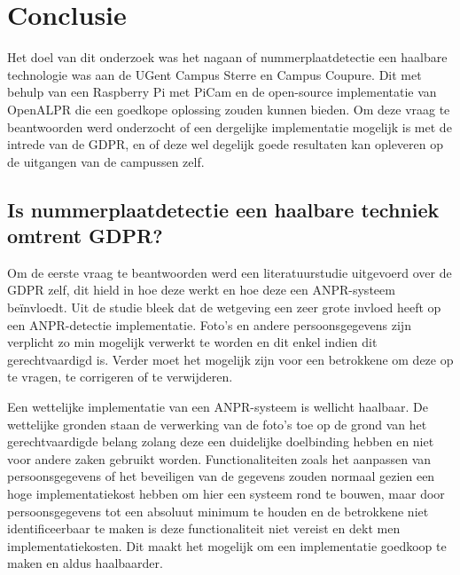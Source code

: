
\chapter{Conclusie}
\label{ch:conclusie}


Het doel van dit onderzoek was het nagaan of nummerplaatdetectie een haalbare technologie was aan de UGent Campus Sterre en Campus Coupure. Dit met behulp van een Raspberry Pi met PiCam en de open-source implementatie van OpenALPR die een goedkope oplossing zouden kunnen bieden. Om deze vraag te beantwoorden werd onderzocht of een dergelijke implementatie mogelijk is met de intrede van de GDPR, en of deze wel degelijk goede resultaten kan opleveren op de uitgangen van de campussen zelf.

\section{Is nummerplaatdetectie een haalbare techniek omtrent GDPR?}
Om de eerste vraag te beantwoorden werd een literatuurstudie uitgevoerd over de GDPR zelf, dit hield in hoe deze werkt en hoe deze een ANPR-systeem beïnvloedt. Uit de studie bleek dat de wetgeving een zeer grote invloed heeft op een ANPR-detectie implementatie. Foto's en andere persoonsgegevens zijn verplicht zo min mogelijk verwerkt te worden en dit enkel indien dit gerechtvaardigd is. Verder moet het mogelijk zijn voor een betrokkene om deze op te vragen, te corrigeren of te verwijderen.

Een wettelijke implementatie van een ANPR-systeem is wellicht haalbaar. De wettelijke gronden staan de verwerking van de foto's toe op de grond van het gerechtvaardigde belang zolang deze een duidelijke doelbinding hebben en niet voor andere zaken gebruikt worden. Functionaliteiten zoals het aanpassen van persoonsgegevens of het beveiligen van de gegevens zouden normaal gezien een hoge implementatiekost hebben om hier een systeem rond te bouwen, maar door persoonsgegevens tot een absoluut minimum te houden en de betrokkene niet identificeerbaar te maken is deze functionaliteit niet vereist en dekt men implementatiekosten. Dit maakt het mogelijk om een implementatie goedkoop te maken en aldus haalbaarder.

